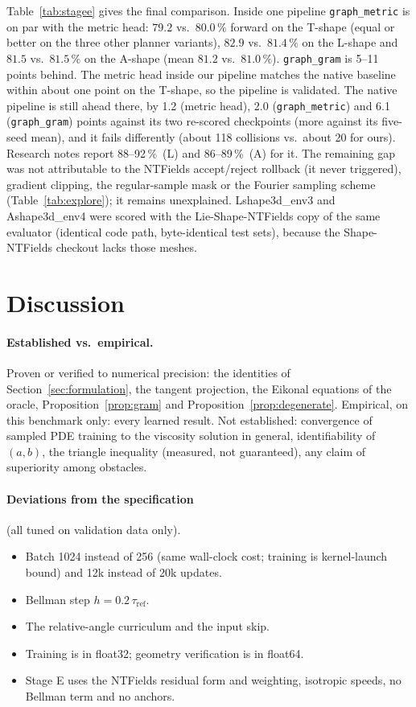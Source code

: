 \documentclass[11pt]{article}
\newcommand{\taur}{\tau_{\mathrm{ref}}}
\newcommand{\code}[1]{\texttt{#1}}
\newcommand{\pct}{\,\%}
\begin{document}
Table~\ref{tab:stagee} gives the final comparison. Inside one pipeline \code{graph\_metric} is on par
with the metric head: $79.2$ vs.\ $80.0\pct$ forward on the T-shape (equal or better on the three other
planner variants), $82.9$ vs.\ $81.4\pct$ on the L-shape and $81.5$ vs.\ $81.5\pct$ on the A-shape
(mean $81.2$ vs.\ $81.0\pct$). \code{graph\_gram} is 5--11 points behind. The metric head inside our
pipeline matches the native baseline within about one point on the T-shape, so the pipeline is
validated. The native pipeline is still ahead there, by 1.2 (metric head), 2.0 (\code{graph\_metric}) and
6.1 (\code{graph\_gram}) points against its two re-scored checkpoints (more against its five-seed mean),
and it fails differently (about 118 collisions vs.\ about 20 for ours). Research notes report 88--92\pct\ (L) and 86--89\pct\
(A) for it. The remaining gap was not attributable to the NTFields accept/reject rollback (it never
triggered), gradient clipping, the regular-sample mask or the Fourier sampling scheme
(Table~\ref{tab:explore}); it remains unexplained. Lshape3d\_env3 and Ashape3d\_env4 were scored with
the Lie-Shape-NTFields copy of the same evaluator (identical code path, byte-identical test sets),
because the Shape-NTFields checkout lacks those meshes.

\section{Discussion}

\paragraph{Established vs.\ empirical.}
Proven or verified to numerical precision: the identities of Section~\ref{sec:formulation}, the
tangent projection, the Eikonal equations of the oracle, Proposition~\ref{prop:gram} and
Proposition~\ref{prop:degenerate}. Empirical, on this benchmark only: every learned result. Not
established: convergence of sampled PDE training to the viscosity solution in general,
identifiability of $(a,b)$, the triangle inequality (measured, not guaranteed), any claim of
superiority among obstacles.

\paragraph{Deviations from the specification} (all tuned on validation data only).
\begin{itemize}
\item Batch 1024 instead of 256 (same wall-clock cost; training is kernel-launch bound) and 12k
instead of 20k updates.
\item Bellman step $h=0.2\,\taur$.
\item The relative-angle curriculum and the input skip.
\item Training is in float32; geometry verification is in float64.
\item Stage E uses the NTFields residual form and weighting, isotropic speeds, no Bellman term and no
anchors.
\end{itemize}
\end{document}
